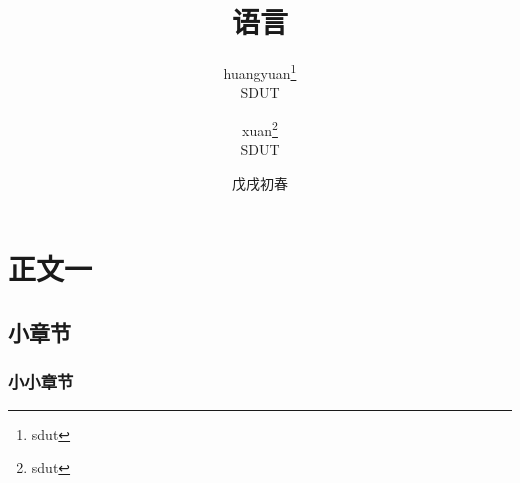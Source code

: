 \documentclass[UTF8,titlepage]{ctexart}
\title {语言}
\author{huangyuan\thanks{sdut}\\SDUT \and xuan\thanks{sdut}\\SDUT}
\date{戊戌初春}
\begin{document}
\maketitle
\tableofcontents

 \section{正文一}
 \subsection{小章节}
 \subsubsection{小小章节}
%
%
\end{document}
